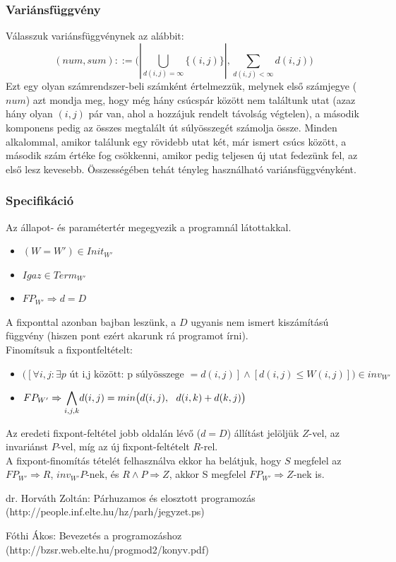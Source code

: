 \documentclass[12pt]{article}
\begin{document}
	\subsubsection{Variánsfüggvény}
	Válasszuk variánsfüggvénynek az alábbit:
	$$(num, sum) ::= \big(|\bigcup\limits_{d(i,j)=\infty} \{(i,j)\}|, \sum_{d(i,j)< \infty } d(i,j) \big)$$
	Ezt egy olyan számrendszer-beli számként értelmezzük, melynek első számjegye ($num$) azt mondja meg, hogy még hány csúcspár között nem találtunk utat (azaz hány olyan $(i,j)$ pár van, ahol a hozzájuk rendelt távolság végtelen), a második komponens pedig az összes megtalált út súlyösszegét számolja össze. Minden alkalommal, amikor találunk egy rövidebb utat két, már ismert csúcs között, a második szám értéke fog csökkenni, amikor pedig teljesen új utat fedezünk fel, az első lesz kevesebb. Összességében tehát tényleg használható variánsfüggvényként.
	
	\subsubsection{Specifikáció}
	Az állapot- és paramétertér megegyezik a programnál látottakkal.
	\begin{itemize}
		\item $(W = W') \in Init_{W'}$
		\item $Igaz \in Term_{W'}$
		\item $FP_{W'} \Rightarrow d = D$
	\end{itemize}
	A fixponttal azonban bajban leszünk, a $D$ ugyanis nem ismert kiszámítású függvény (hiszen pont ezért akarunk rá programot írni).\\
	Finomítsuk a fixpontfeltételt:
	\begin{itemize}
		\item $\big([\forall i,j: \exists p \text{ út i,j között: p súlyösszege }=d(i,j)] \land [d(i,j)\le W(i,j)]\big) \in inv_{W'}$
		\item $FP_{W'} \Rightarrow {\mathlarger\bigwedge\limits_{i,j,k}} d(i,j) = min\big(d(i,j),\ \ d(i,k) + d(k,j)\big)$
	\end{itemize}
	Az eredeti fixpont-feltétel jobb oldalán lévő ($d=D$) állítást jelöljük $Z$-vel, az invariánst $P$-vel, míg az új fixpont-feltételt $R$-rel.\\
	A fixpont-finomítás tételét felhasználva ekkor ha belátjuk, hogy $S$ megfelel az $FP_{W'} \Rightarrow R$, $inv_{W'}P$-nek, és $R \land P \Rightarrow Z$, akkor S megfelel $FP_{W'} \Rightarrow Z$-nek is.
	\newpage
	\begin{thebibliography}{9}
		\raggedright
		dr. Horváth Zoltán: Párhuzamos és elosztott programozás (http://people.inf.elte.hu/hz/parh/jegyzet.ps)
		
		Fóthi Ákos: Bevezetés a programozáshoz (http://bzsr.web.elte.hu/progmod2/konyv.pdf)
		
	\end{thebibliography}
\end{document}
